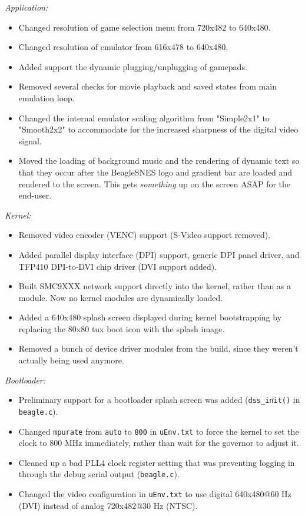 \noindent{}\emph{Application:}
\begin{itemize}
\item Changed resolution of game selection menu from 720x482 to 640x480.
\item Changed resolution of emulator from 616x478 to 640x480.
\item Added support the dynamic plugging/unplugging of gamepads.
\item Removed several checks for movie playback and saved states from main emulation loop.
\item Changed the internal emulator scaling algorithm from "Simple2x1" to "Smooth2x2" to accommodate for the increased sharpness of the digital video signal. 
\item Moved the loading of background music and the rendering of dynamic text so that they occur after the BeagleSNES logo and gradient bar are loaded and rendered to the screen.  This gets \emph{something} up on the screen ASAP for the end-user.
\end{itemize}
\noindent{}\emph{Kernel:}
\begin{itemize}
\item Removed video encoder (VENC) support (S-Video support removed).
\item Added parallel display interface (DPI) support, generic DPI panel driver, and TFP410 DPI-to-DVI chip driver (DVI support added).
\item Built SMC9XXX network support directly into the kernel, rather than as a module.  Now no kernel modules are dynamically loaded.
\item Added a 640x480 splash screen displayed during kernel bootstrapping by replacing the 80x80 tux boot icon with the splash image.
\item Removed a bunch of device driver modules from the build, since they weren't actually being used anymore.
\end{itemize}
\noindent{}\emph{Bootloader:}
\begin{itemize}
\item Preliminary support for a bootloader splash screen was added (\texttt{dss\_init()} in \texttt{beagle.c}).
\item Changed \texttt{mpurate} from \texttt{auto} to \texttt{800} in \texttt{uEnv.txt} to force the kernel to set the clock to 800 MHz immediately, rather than wait for the governor to adjust it.
\item Cleaned up a bad PLL4 clock register setting that was preventing logging in through the debug serial output (\texttt{beagle.c}). 
\item Changed the video configuration in \texttt{uEnv.txt} to use digital 640x480@60 Hz (DVI) instead of analog 720x482@30 Hz (NTSC).
\end{itemize}
